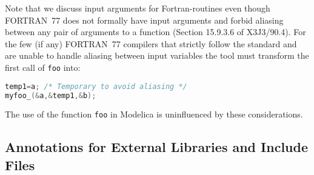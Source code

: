 \begin{example}
Note that we discuss input arguments for Fortran-routines even
though FORTRAN~77 does not formally have input arguments and forbid
aliasing between any pair of arguments to a function (Section 15.9.3.6
of X3J3/90.4). For the few (if any) FORTRAN~77 compilers that strictly
follow the standard and are unable to handle aliasing between input
variables the tool must transform the first call of \lstinline!foo! into:
\begin{lstlisting}[language=C]
temp1=a; /* Temporary to avoid aliasing */
myfoo_(&a,&temp1,&b);
\end{lstlisting}

The use of the function \lstinline!foo! in Modelica is uninfluenced by these considerations.
\end{example}

\subsection{Annotations for External Libraries and Include Files}\label{annotations-for-external-libraries-and-include-files}

